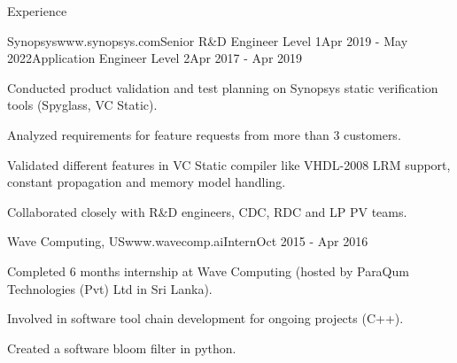 \documentclass[
11pt, %
]{./assets/resume} %
\begin{document}
\begin{rSection}{Experience}
\begin{rSubsectionM}{Synopsys}{www.synopsys.com}{Senior R\&D Engineer Level 1}{Apr 2019 - May 2022}{Application Engineer Level 2}{Apr 2017 - Apr 2019}{}{}
		\item Conducted product validation and test planning on Synopsys static verification tools (Spyglass, VC Static).
		\item Analyzed requirements for feature requests from more than 3 customers.
		\item Validated different features in VC Static compiler like VHDL-2008 LRM support, constant propagation and memory model handling.
		\item Collaborated closely with R\&D engineers, CDC, RDC and LP PV teams.
	\end{rSubsectionM}
	\begin{rSubsectionX}{Wave Computing, US}{www.wavecomp.ai}{Intern}{Oct 2015 - Apr 2016}
		\item Completed 6 months internship at Wave Computing (hosted by ParaQum Technologies (Pvt) Ltd in Sri Lanka).
		\item Involved in software tool chain development for ongoing projects (C++).
		\item Created a software bloom filter in python.
	\end{rSubsectionX}
	
\end{rSection}


	
\end{document}
